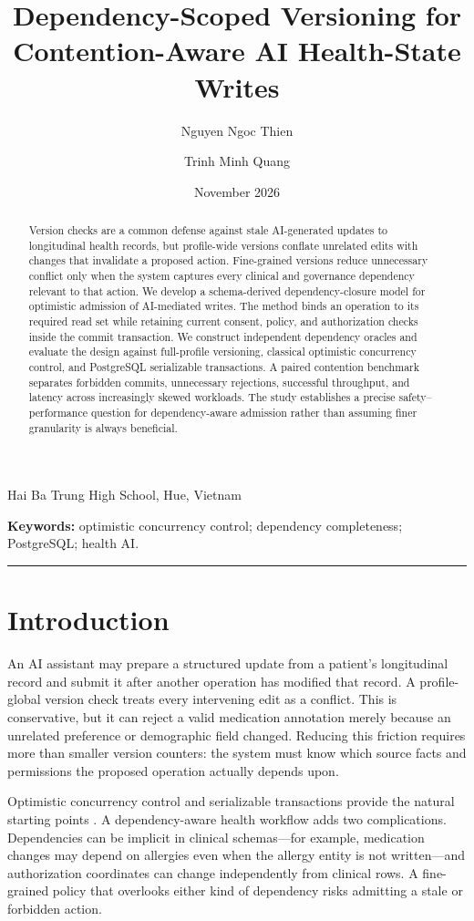 \documentclass[11pt,a4paper]{article}
\title{\vspace{-1em}\textbf{Dependency-Scoped Versioning for Contention-Aware AI Health-State Writes}}
\author{Nguyen Ngoc Thien \and Trinh Minh Quang}\date{November 2026}
\begin{document}
\maketitle
\begin{center}\small Hai Ba Trung High School, Hue, Vietnam\end{center}
\begin{abstract}
Version checks are a common defense against stale AI-generated updates to longitudinal health records, but profile-wide versions conflate unrelated edits with changes that invalidate a proposed action. Fine-grained versions reduce unnecessary conflict only when the system captures every clinical and governance dependency relevant to that action. We develop a schema-derived dependency-closure model for optimistic admission of AI-mediated writes. The method binds an operation to its required read set while retaining current consent, policy, and authorization checks inside the commit transaction. We construct independent dependency oracles and evaluate the design against full-profile versioning, classical optimistic concurrency control, and PostgreSQL serializable transactions. A paired contention benchmark separates forbidden commits, unnecessary rejections, successful throughput, and latency across increasingly skewed workloads. The study establishes a precise safety–performance question for dependency-aware admission rather than assuming finer granularity is always beneficial.
\end{abstract}
\noindent\textbf{Keywords:} optimistic concurrency control; dependency completeness; PostgreSQL; health AI.
\medskip\hrule\medskip

\section{Introduction}
An AI assistant may prepare a structured update from a patient's longitudinal record and submit it after another operation has modified that record. A profile-global version check treats every intervening edit as a conflict. This is conservative, but it can reject a valid medication annotation merely because an unrelated preference or demographic field changed. Reducing this friction requires more than smaller version counters: the system must know which source facts and permissions the proposed operation actually depends upon.

Optimistic concurrency control and serializable transactions provide the natural starting points \cite{kung1981,herlihy1990}. A dependency-aware health workflow adds two complications. Dependencies can be implicit in clinical schemas—for example, medication changes may depend on allergies even when the allergy entity is not written—and authorization coordinates can change independently from clinical rows. A fine-grained policy that overlooks either kind of dependency risks admitting a stale or forbidden action.
\end{document}
